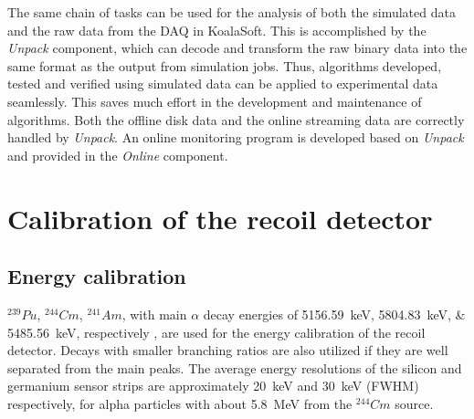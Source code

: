 \documentclass[number,5p]{elsarticle}
\begin{document}
The same chain of tasks can be used for the analysis of both the simulated data
and the raw data from the DAQ in KoalaSoft.
This is accomplished by the \textit{Unpack} component, which can decode and transform the raw binary data into the same format as the output from simulation jobs.
Thus, algorithms developed, tested and verified using simulated data can be applied to experimental data seamlessly.
This saves much effort in the development and maintenance of algorithms.
Both the offline disk data and the online streaming data are correctly handled
by \textit{Unpack}.
An online monitoring program is developed based on \textit{Unpack} and provided
in the \textit{Online} component.

\section{Calibration of the recoil detector}
\label{sec:calibration}

\subsection{Energy calibration}
\label{sec:energy_calibration}

\(^{239}Pu\), \(^{244}Cm\), \(^{241}Am\), with main $\alpha$ decay energies
of \SIlist{5156.59;5804.83;5485.56}{\keV}, respectively \cite{nuclear_data}, are
used for the energy calibration of the recoil detector.
Decays with smaller branching ratios are also utilized if they are well separated from the main peaks.
The average energy resolutions of the silicon and germanium
sensor strips are approximately \SI{20}{\keV} and \SI{30}{\keV} (FWHM)
respectively, for alpha particles with about \SI{5.8}{\MeV} from the $^{244}Cm$ source.
\end{document}

